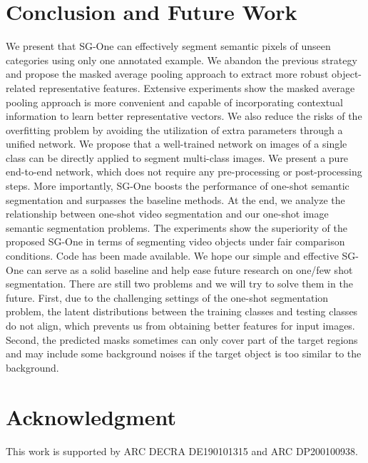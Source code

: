 \documentclass[journal]{IEEEtran}
\begin{document}
\section{Conclusion and Future Work}
We present that SG-One can effectively segment semantic pixels of unseen categories using only one annotated example.
We abandon the previous strategy~\cite{shaban2017one,rakelly2018conditional} and propose the masked average pooling approach to extract more robust object-related representative features. 
Extensive experiments show the masked average pooling approach is more convenient and capable of incorporating contextual information to learn better representative vectors.
We also reduce the risks of the overfitting problem by avoiding the utilization of extra parameters through a unified network. 
We propose that a well-trained network on images of a single class can be directly applied to segment multi-class images.
We present a pure end-to-end network, which does not require any pre-processing or post-processing steps. 
More importantly, SG-One boosts the performance of one-shot semantic segmentation and surpasses the baseline methods.
At the end, we analyze the relationship between one-shot video segmentation and our one-shot image semantic segmentation problems.
The experiments show the superiority of the proposed SG-One in terms of segmenting video objects under fair comparison conditions.
Code has been made available. We hope our simple and effective SG-One can serve as a solid baseline and help ease future research on one/few shot segmentation.
There are still two problems and we will try to solve them in the future. First, due to the challenging settings of the one-shot segmentation problem, the latent distributions between the training classes and testing classes do not align, which prevents us from obtaining better features for input images. Second, the predicted masks sometimes can only cover part of the target regions and may include some background noises if the target object is too similar to the background.



\section*{Acknowledgment}
This work is supported by ARC DECRA DE190101315 and ARC DP200100938.

\ifCLASSOPTIONcaptionsoff
  \newpage
\fi
\end{document}
